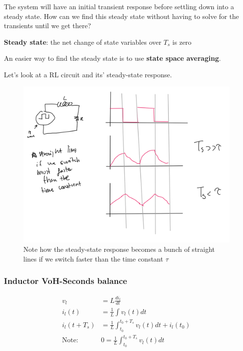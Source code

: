 \documentclass[../notes.tex]{subfiles}
\begin{document}
The system will have an initial transient response before settling down into a steady state.
How can we find this steady state without having to solve for the transients until we get there?


\begin{definition}
\textbf{Steady state}: the net change of state variables over $ T_s $ is zero
\end{definition}


An easier way to find the steady state is to use \textbf{state space averaging}.

Let's look at a RL circuit and its' steady-state response.

\begin{figure}[H]
	\centering
	\includegraphics[width=0.8\linewidth]{img/image_2022-09-26-11-35-51.png}
	\caption{Note how the steady-state response becomes a bunch of straight lines if we switch faster than the time constant $ \tau $ }
\end{figure}


\subsubsection{Inductor VoH-Seconds balance}


\begin{equation}
	\begin{split}
		v_l &= L \frac{di_l}{dt}  \\
		i_{l}(t)  &= \frac{1}{L} \int v_l(t) dt  \\
		i_{l}(t+T_s)  &= \frac{1}{L} \int_{t_0}^{t_0 + T_s}  v_l(t) dt + i_l(t_0) \\
		\text{Note: } & 0 = \frac{1}{L} \int_{t_0}^{t_0 + T_s}  v_l(t) dt
	\end{split}
\end{equation}
\end{document}

